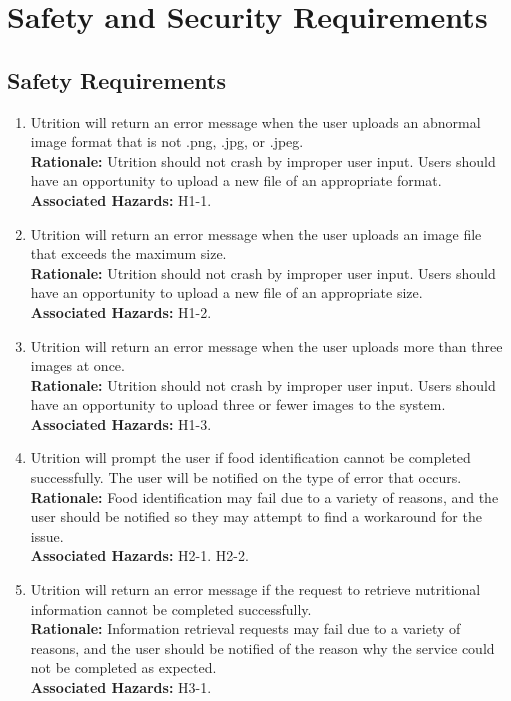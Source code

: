 \documentclass{article}
\begin{document}
\section{Safety and Security Requirements}
\subsection{Safety Requirements}
\begin{enumerate}[{SR}1.]
	\item Utrition will return an error message when the user uploads an abnormal 
	image format that is not .png, .jpg, or .jpeg. \\
	\textbf{Rationale:}  Utrition should not crash by improper user 
	input. Users should have an opportunity to upload a new file of an appropriate format.\\	
	\textbf{Associated Hazards:} H1-1.
	
	\item Utrition will return an error message when the user uploads an image file that exceeds the maximum size. \\
	\textbf{Rationale:}  Utrition should not crash by improper user 
	input. Users should have an opportunity to upload a new file of an appropriate size.\\	
	\textbf{Associated Hazards:} H1-2.
	
	\item Utrition will return an error message when the user uploads more than three images at once. \\
	\textbf{Rationale:}  Utrition should not crash by improper user 
	input. Users should have an opportunity to upload three or fewer images to the system.\\	
	\textbf{Associated Hazards:} H1-3.
	
	\item Utrition will prompt the user if food identification cannot 
	be completed successfully. The user will be notified on the type of error 
	that occurs. \\
	\textbf{Rationale:}  Food identification may fail due to a variety of 
	reasons, and the user should be notified so they may attempt to find a  
	workaround for the issue. \\	
	\textbf{Associated Hazards:} H2-1. H2-2.
	
	\item Utrition will return an error message if the request to retrieve 
	nutritional information cannot be completed successfully. \\
	\textbf{Rationale:}  Information retrieval requests may fail due to a 
	variety of reasons, and the user should be notified of the reason why the 
	service could not be completed as expected.\\	
	\textbf{Associated Hazards:} H3-1.
	

\end{enumerate}
\end{document}
